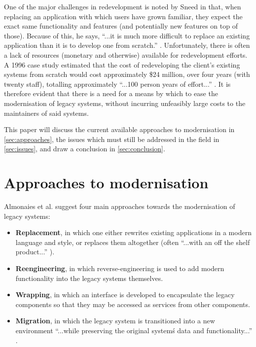 \documentclass[12pt,journal,compsoc]{IEEEtran}
\begin{document}
One of the major challenges in redevelopment is noted by Sneed \cite{Sneed2011} in that, when replacing an application with which users have grown familiar, they expect the exact same functionality and features (and potentially new features on top of those). Because of this, he says, ``...it is much more difficult to replace an existing application than it is to develop one from scratch.'' \cite{Sneed2011}. Unfortunately, there is often a lack of resources (monetary and otherwise) available for redevelopment efforts. A 1996 case study \cite{Duncan1996} estimated that the cost of redeveloping the client's existing systems from scratch would cost approximately \$24 million, over four years (with twenty staff), totalling approximately ``...100 person years of effort...'' \cite{Duncan1996}. It is therefore evident that there is a need for a means by which to ease the modernisation of legacy systems, without incurring unfeasibly large costs to the maintainers of said systems.

This paper will discuss the current available approaches to modernisation in \autoref{sec:approaches}, the issues which must still be addressed in the field in \autoref{sec:issues}, and draw a conclusion  in \autoref{sec:conclusion}.

\section{Approaches to modernisation}
\label{sec:approaches}

Almonaies et al. \cite{Almonaies2010} suggest four main approaches towards the modernisation of legacy systems:
\begin{itemize}
\item\textbf{Replacement}, in which one either rewrites existing applications in a modern language and style, or replaces them altogether (often ``...with an off the shelf product...'' \cite{Almonaies2010}).
\item\textbf{Reengineering}, in which reverse-engineering is used to add modern functionality into the legacy systems themselves.
\item\textbf{Wrapping}, in which an interface is developed to encapsulate the legacy components so that they may be accessed as services from other components.
\item\textbf{Migration}, in which the legacy system is transitioned into a new environment ``...while preserving the original system\'s data and functionality...'' \cite{Almonaies2010}.
\end{itemize}
\end{document}
